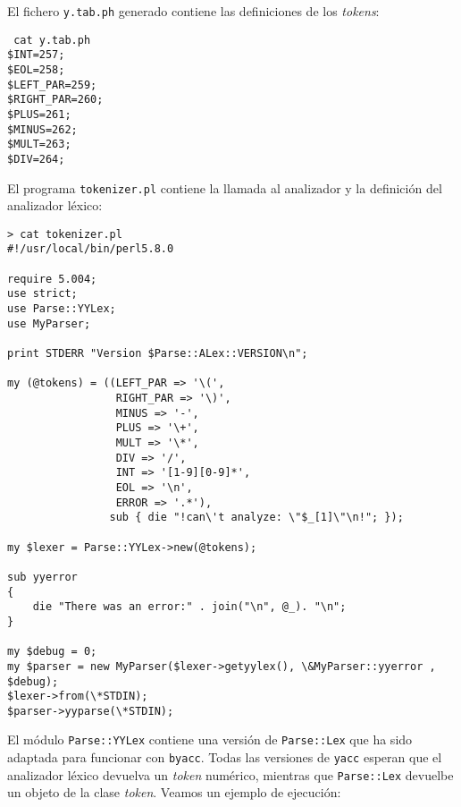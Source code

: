 El fichero \verb|y.tab.ph| generado contiene las definiciones de los \emph{tokens}:
\begin{verbatim}
 cat y.tab.ph
$INT=257;
$EOL=258;
$LEFT_PAR=259;
$RIGHT_PAR=260;
$PLUS=261;
$MINUS=262;
$MULT=263;
$DIV=264;
\end{verbatim}
El programa \verb|tokenizer.pl| contiene la llamada al analizador 
y la definición del analizador léxico:
\begin{verbatim}
> cat tokenizer.pl
#!/usr/local/bin/perl5.8.0

require 5.004;
use strict;
use Parse::YYLex;
use MyParser;

print STDERR "Version $Parse::ALex::VERSION\n";

my (@tokens) = ((LEFT_PAR => '\(',
                 RIGHT_PAR => '\)',
                 MINUS => '-',
                 PLUS => '\+',
                 MULT => '\*',
                 DIV => '/',
                 INT => '[1-9][0-9]*',
                 EOL => '\n',
                 ERROR => '.*'),
                sub { die "!can\'t analyze: \"$_[1]\"\n!"; });

my $lexer = Parse::YYLex->new(@tokens);

sub yyerror
{
    die "There was an error:" . join("\n", @_). "\n";
}

my $debug = 0;
my $parser = new MyParser($lexer->getyylex(), \&MyParser::yyerror , $debug);
$lexer->from(\*STDIN);
$parser->yyparse(\*STDIN);
\end{verbatim}
El módulo \verb|Parse::YYLex| contiene una versión de \verb|Parse::Lex| 
que ha sido adaptada para funcionar con  \verb|byacc|. Todas las versiones de \verb|yacc| 
esperan que el analizador léxico devuelva un \emph{token} numérico, mientras que 
\verb|Parse::Lex| devuelbe un objeto de la clase \emph{token}.
Veamos un ejemplo de ejecución:
